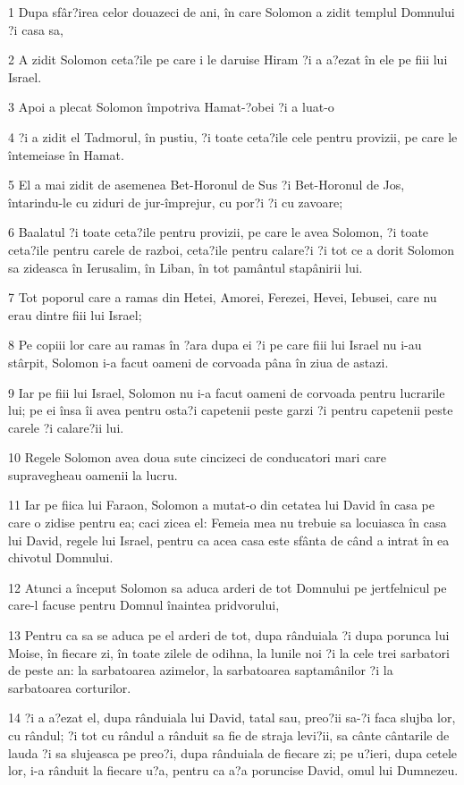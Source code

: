 \par 1 Dupa sfâr?irea celor douazeci de ani, în care Solomon a zidit templul Domnului ?i casa sa,
\par 2 A zidit Solomon ceta?ile pe care i le daruise Hiram ?i a a?ezat în ele pe fiii lui Israel.
\par 3 Apoi a plecat Solomon împotriva Hamat-?obei ?i a luat-o
\par 4 ?i a zidit el Tadmorul, în pustiu, ?i toate ceta?ile cele pentru provizii, pe care le întemeiase în Hamat.
\par 5 El a mai zidit de asemenea Bet-Horonul de Sus ?i Bet-Horonul de Jos, întarindu-le cu ziduri de jur-împrejur, cu por?i ?i cu zavoare;
\par 6 Baalatul ?i toate ceta?ile pentru provizii, pe care le avea Solomon, ?i toate ceta?ile pentru carele de razboi, ceta?ile pentru calare?i ?i tot ce a dorit Solomon sa zideasca în Ierusalim, în Liban, în tot pamântul stapânirii lui.
\par 7 Tot poporul care a ramas din Hetei, Amorei, Ferezei, Hevei, Iebusei, care nu erau dintre fiii lui Israel;
\par 8 Pe copiii lor care au ramas în ?ara dupa ei ?i pe care fiii lui Israel nu i-au stârpit, Solomon i-a facut oameni de corvoada pâna în ziua de astazi.
\par 9 Iar pe fiii lui Israel, Solomon nu i-a facut oameni de corvoada pentru lucrarile lui; pe ei însa îi avea pentru osta?i capetenii peste garzi ?i pentru capetenii peste carele ?i calare?ii lui.
\par 10 Regele Solomon avea doua sute cincizeci de conducatori mari care supravegheau oamenii la lucru.
\par 11 Iar pe fiica lui Faraon, Solomon a mutat-o din cetatea lui David în casa pe care o zidise pentru ea; caci zicea el: Femeia mea nu trebuie sa locuiasca în casa lui David, regele lui Israel, pentru ca acea casa este sfânta de când a intrat în ea chivotul Domnului.
\par 12 Atunci a început Solomon sa aduca arderi de tot Domnului pe jertfelnicul pe care-l facuse pentru Domnul înaintea pridvorului,
\par 13 Pentru ca sa se aduca pe el arderi de tot, dupa rânduiala ?i dupa porunca lui Moise, în fiecare zi, în toate zilele de odihna, la lunile noi ?i la cele trei sarbatori de peste an: la sarbatoarea azimelor, la sarbatoarea saptamânilor ?i la sarbatoarea corturilor.
\par 14 ?i a a?ezat el, dupa rânduiala lui David, tatal sau, preo?ii sa-?i faca slujba lor, cu rândul; ?i tot cu rândul a rânduit sa fie de straja levi?ii, sa cânte cântarile de lauda ?i sa slujeasca pe preo?i, dupa rânduiala de fiecare zi; pe u?ieri, dupa cetele lor, i-a rânduit la fiecare u?a, pentru ca a?a poruncise David, omul lui Dumnezeu.
